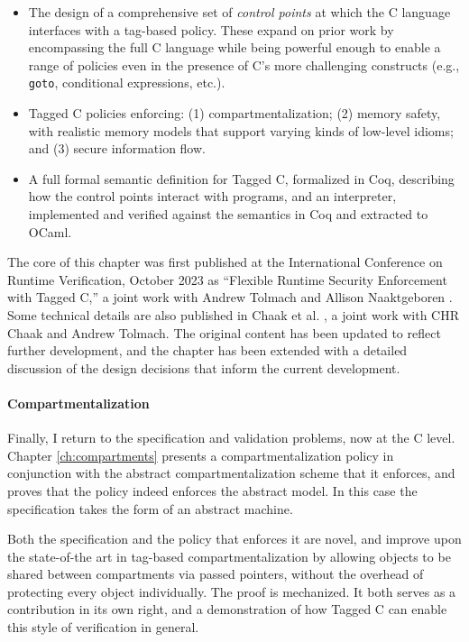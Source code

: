 \documentclass{report}
\begin{document}
\begin{itemize}
\item The design of a comprehensive set of {\em control points} at which the C language interfaces
  with a tag-based policy. These expand on prior work by encompassing the full C language
  while being powerful enough to enable a range of policies even in the presence of C's more
  challenging constructs (e.g., {\tt goto}, conditional expressions, etc.).
\item Tagged C policies enforcing: (1) compartmentalization;
  (2) memory safety, with realistic memory models that support varying kinds of low-level idioms;
  and (3) secure information flow.
\item A full formal semantic definition for Tagged C, formalized in Coq, describing how the
  control points interact with programs, and an interpreter, implemented and verified against
  the semantics in Coq and extracted to OCaml.
\end{itemize}

The core of this chapter was first published at the International Conference on Runtime Verification,
October 2023 as ``Flexible Runtime Security Enforcement with Tagged C,'' a joint work
with Andrew Tolmach and Allison Naaktgeboren \cite{Anderson23:TaggedC}. Some technical
details are also published in Chaak et al. \cite{}, a joint work with CHR Chaak and Andrew Tolmach.
The original content has been updated to reflect further development, and the chapter has been
extended with a detailed discussion of the design decisions that inform the current development.

\paragraph{Compartmentalization}

Finally, I return to the specification and validation problems, now at the C level. Chapter
\ref{ch:compartments} presents a compartmentalization policy in conjunction with the abstract
compartmentalization scheme that it enforces, and proves that the policy indeed enforces the
abstract model. In this case the specification takes the form of an abstract machine.

Both the specification and the policy that enforces it are novel, and improve upon the
state-of-the art in tag-based compartmentalization by allowing objects to be shared between
compartments via passed pointers, without the overhead of protecting every object individually.
The proof is mechanized. It both serves as a contribution in its own right, and a demonstration
of how Tagged C can enable this style of verification in general. 
\end{document}
